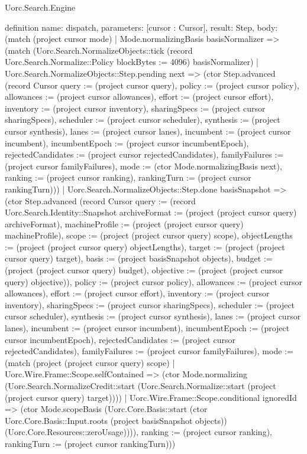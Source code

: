 \begin{lexlean}{Uorc.Search.Engine}
\begin{semanticmodule}
definition{
  name: dispatch,
  parameters: [cursor : Cursor],
  result: Step,
  body: (match (project cursor mode)
    | Mode.normalizingBasis basisNormalizer => (match (Uorc.Search.NormalizeObjects::tick (record Uorc.Search.Normalize::Policy {blockBytes := 4096}) basisNormalizer)
      | Uorc.Search.NormalizeObjects::Step.pending next => (ctor Step.advanced (record Cursor {query := (project cursor query), policy := (project cursor policy), allowances := (project cursor allowances), effort := (project cursor effort), inventory := (project cursor inventory), sharingSpecs := (project cursor sharingSpecs), scheduler := (project cursor scheduler), synthesis := (project cursor synthesis), lanes := (project cursor lanes), incumbent := (project cursor incumbent), incumbentEpoch := (project cursor incumbentEpoch), rejectedCandidates := (project cursor rejectedCandidates), familyFailures := (project cursor familyFailures), mode := (ctor Mode.normalizingBasis next), ranking := (project cursor ranking), rankingTurn := (project cursor rankingTurn)}))
      | Uorc.Search.NormalizeObjects::Step.done basisSnapshot => (ctor Step.advanced (record Cursor {query := (record Uorc.Search.Identity::Snapshot {archiveFormat := (project (project cursor query) archiveFormat), machineProfile := (project (project cursor query) machineProfile), scope := (project (project cursor query) scope), objectLengths := (project (project cursor query) objectLengths), target := (project (project cursor query) target), basis := (project basisSnapshot objects), budget := (project (project cursor query) budget), objective := (project (project cursor query) objective)}), policy := (project cursor policy), allowances := (project cursor allowances), effort := (project cursor effort), inventory := (project cursor inventory), sharingSpecs := (project cursor sharingSpecs), scheduler := (project cursor scheduler), synthesis := (project cursor synthesis), lanes := (project cursor lanes), incumbent := (project cursor incumbent), incumbentEpoch := (project cursor incumbentEpoch), rejectedCandidates := (project cursor rejectedCandidates), familyFailures := (project cursor familyFailures), mode := (match (project (project cursor query) scope)
        | Uorc.Wire.Frame::Scope.selfContained => (ctor Mode.normalizing (Uorc.Search.NormalizeCredit::start (Uorc.Search.Normalize::start (project (project cursor query) target))))
        | Uorc.Wire.Frame::Scope.conditional ignoredId => (ctor Mode.scopeBasis (Uorc.Core.Basis::start (ctor Uorc.Core.Basis::Input.roots (project basisSnapshot objects)) (Uorc.Core.Resources::zeroUsage)))), ranking := (project cursor ranking), rankingTurn := (project cursor rankingTurn)}))
}
\end{semanticmodule}
\end{lexlean}

